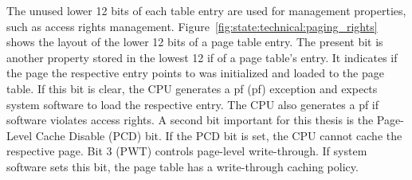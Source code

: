The unused lower 12 bits of each table entry are used for management properties,
such as access rights management. Figure~\ref{fig:state:technical:paging_rights}
shows the layout of the lower 12 bits of a page table entry. The present bit is
another property stored in the lowest 12 if of a page table's entry. It
indicates if the page the respective entry points to was initialized and loaded
to the page table. If this bit is clear, the CPU generates a \gls{pf}
(\gls{pf}) exception and expects system software to load the respective
entry. The CPU also generates a \gls{pf} if software violates access
rights. A second bit important for this thesis is the Page-Level Cache Disable
(PCD) bit. If the PCD bit is set, the CPU cannot cache the respective page. Bit
3 (PWT) controls page-level write-through. If system software sets this bit, the
page table has a write-through caching policy.

